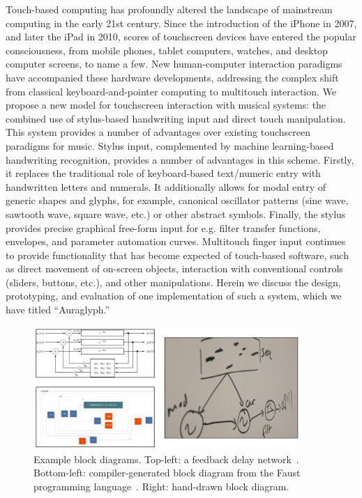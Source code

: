 \documentclass{nime-alternate}
\begin{document}
Touch-based computing has profoundly altered the landscape of mainstream computing in the early 21st century. 
Since the introduction of the iPhone in 2007, and later the iPad in 2010, scores of touchscreen devices have entered the popular consciousness, from mobile phones, tablet computers, watches, and desktop computer screens, to name a few. 
New human-computer interaction paradigms have accompanied these hardware developments, addressing the complex shift from classical keyboard-and-pointer computing to multitouch interaction. 
We propose a new model for touchscreen interaction with musical systems: the combined use of stylus-based handwriting input and direct touch manipulation. 
This system provides a number of advantages over existing touchscreen paradigms for music. 
Stylus input, complemented by machine learning-based handwriting recognition, provides a number of advantages in this scheme. 
Firstly, it replaces the traditional role of keyboard-based text/numeric entry with handwritten letters and numerals.
It additionally allows for modal entry of generic shapes and glyphs, for example, canonical oscillator patterns (sine wave, sawtooth wave, square wave, etc.) or other abstract symbols.
Finally, the stylus provides precise graphical free-form input for e.g. filter transfer functions, envelopes, and parameter automation curves. 
Multitouch finger input continues to provide functionality that has become expected of touch-based software, such as direct movement of on-screen objects, interaction with conventional controls (sliders, buttons, etc.), and other manipulations. 
Herein we discuss the design, prototyping, and evaluation of one implementation of such a system, which we have titled ``Auraglyph.''

\begin{figure}[h!]
	\centering
		\includegraphics[width=0.9\textwidth]{figures/block.png}
	\caption{Example block diagrams. Top-left: a feedback delay network\protect~\cite{smith2010pasp}. Bottom-left: compiler-generated block diagram from the Faust programming language\protect~\cite{faustOnline}. Right: hand-drawn block diagram.}
	\label{fig:blockDiagram}
\end{figure}
\end{document}
